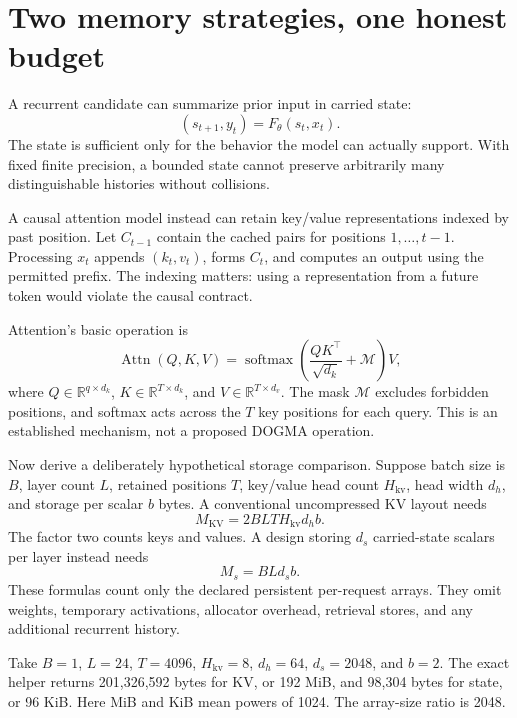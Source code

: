 \section{Two memory strategies, one honest budget}\label{sec:memory}
A recurrent candidate can summarize prior input in carried state:
\[
 (s_{t+1},y_t)=F_\theta(s_t,x_t).
\]
The state is sufficient only for the behavior the model can actually support. With fixed finite precision, a bounded state cannot preserve arbitrarily many distinguishable histories without collisions.

A causal attention model instead can retain key/value representations indexed by past position. Let $C_{t-1}$ contain the cached pairs for positions $1,\ldots,t-1$. Processing $x_t$ appends $(k_t,v_t)$, forms $C_t$, and computes an output using the permitted prefix. The indexing matters: using a representation from a future token would violate the causal contract.


Attention's basic operation is
\[
 \operatorname{Attn}(Q,K,V)=
 \operatorname{softmax}\!\left(\frac{QK^\top}{\sqrt{d_k}}+\mathcal M\right)V,
\]
where $Q\in\mathbb R^{q\times d_k}$, $K\in\mathbb R^{T\times d_k}$, and $V\in\mathbb R^{T\times d_v}$. The mask $\mathcal M$ excludes forbidden positions, and softmax acts across the $T$ key positions for each query. This is an established mechanism, not a proposed DOGMA operation.\cite{attention}

Now derive a deliberately hypothetical storage comparison. Suppose batch size is $B$, layer count $L$, retained positions $T$, key/value head count $H_{\mathrm{kv}}$, head width $d_h$, and storage per scalar $b$ bytes. A conventional uncompressed KV layout needs
\[
 M_{\mathrm{KV}}=2BLTH_{\mathrm{kv}}d_hb.
\]
The factor two counts keys and values. A design storing $d_s$ carried-state scalars per layer instead needs
\[
 M_s=BLd_sb.
\]
These formulas count only the declared persistent per-request arrays. They omit weights, temporary activations, allocator overhead, retrieval stores, and any additional recurrent history.

Take $B=1$, $L=24$, $T=4096$, $H_{\mathrm{kv}}=8$, $d_h=64$, $d_s=2048$, and $b=2$. The exact helper returns 201,326,592 bytes for KV, or 192 MiB, and 98,304 bytes for state, or 96 KiB. Here MiB and KiB mean powers of 1024. The array-size ratio is 2048.

